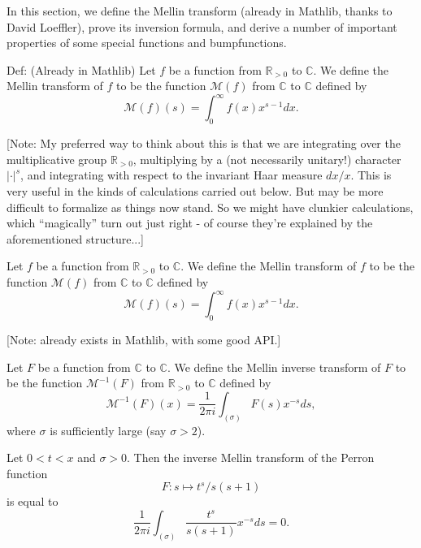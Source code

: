 
In this section, we define the Mellin transform (already in Mathlib, thanks to David Loeffler),
prove its inversion formula, and
derive a number of important properties of some special functions and bumpfunctions.

Def: (Already in Mathlib)
Let $f$ be a function from $\mathbb{R}_{>0}$ to $\mathbb{C}$. We define the Mellin transform of
$f$ to be the function $\mathcal{M}(f)$ from $\mathbb{C}$ to $\mathbb{C}$ defined by
$$\mathcal{M}(f)(s) = \int_0^\infty f(x)x^{s-1}dx.$$

[Note: My preferred way to think about this is that we are integrating over the multiplicative
group $\mathbb{R}_{>0}$, multiplying by a (not necessarily unitary!) character $|\cdot|^s$, and
integrating with respect to the invariant Haar measure $dx/x$. This is very useful in the kinds
of calculations carried out below. But may be more difficult to formalize as things now stand. So
we might have clunkier calculations, which ``magically'' turn out just right - of course they're
explained by the aforementioned structure...]



\begin{definition}[MellinTransform]\label{MellinTransform}\leanok
Let $f$ be a function from $\mathbb{R}_{>0}$ to $\mathbb{C}$. We define the Mellin transform of
$f$ to be
the function $\mathcal{M}(f)$ from $\mathbb{C}$ to $\mathbb{C}$ defined by
$$\mathcal{M}(f)(s) = \int_0^\infty f(x)x^{s-1}dx.$$
\end{definition}
[Note: already exists in Mathlib, with some good API.]


\begin{definition}[MellinInverseTransform]\label{MellinInverseTransform}
\leanok
Let $F$ be a function from $\mathbb{C}$ to $\mathbb{C}$. We define the Mellin inverse transform of
$F$ to be the function $\mathcal{M}^{-1}(F)$ from $\mathbb{R}_{>0}$ to $\mathbb{C}$ defined by
$$\mathcal{M}^{-1}(F)(x) = \frac{1}{2\pi i}\int_{(\sigma)}F(s)x^{-s}ds,$$
where $\sigma$ is sufficiently large (say $\sigma>2$).
\end{definition}


\begin{lemma}[PerronInverseMellin_lt]\label{PerronInverseMellin_lt}
\leanok
Let $0 < t < x$ and $\sigma>0$. Then the inverse Mellin transform of the Perron function
$$F: s\mapsto t^s/s(s+1)$$ is equal to
$$\frac{1}{2\pi i}\int_{(\sigma)}\frac{t^s}{s(s+1)}x^{-s}ds
= 0.$$
\end{lemma}


